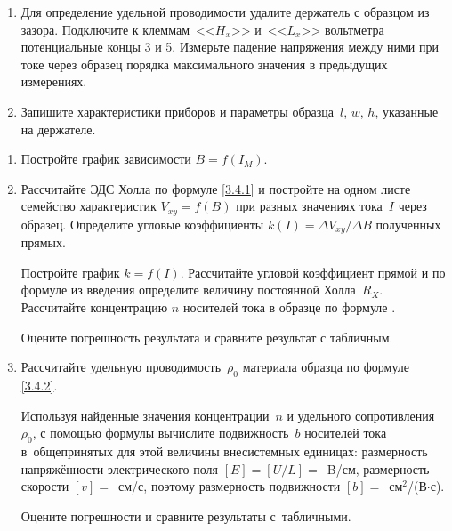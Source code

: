 \begin{lab:task}
\begin{enumerate}
{Направление тока в образце показано знаками~<<$+$>> и~<<$-$>> на
рис.~. Направление тока в обмотках электромагнита при установке
разъёма $K_1$ в положение I показано стрелкой на торце магнита.

Зарисуйте в тетради образец. Укажите на рисунке направления тока, магнитного
поля и отклонение носителей. По знаку ($\pm$) на клеммах цифрового вольтметра
определите характер проводимости.}

\item{Для определение удельной проводимости удалите держатель с образцом из
зазора. Подключите к клеммам~<<$H_{x}$>> и~<<$L_{x}$>> вольтметра потенциальные
концы 3 и 5. Измерьте падение напряжения между ними при токе через образец
порядка максимального значения в предыдущих измерениях.}

\item{ Запишите характеристики приборов и параметры образца~$l$, $w$, $h$,
указанные на держателе.}
\end{enumerate}

\begin{enumerate}

\item {Постройте график зависимости $B=f(I_{M})$.}

\item{ Рассчитайте ЭДС Холла по формуле \eqref{3.4.1} и постройте на одном листе
семейство характеристик $V_{xy}=f(B)$ при разных значениях тока~$I$ через
образец. Определите угловые коэффициенты $k(I)=\Delta{V_{xy}}/\Delta B$
полученных прямых.

Постройте график $k=f(I)$. Рассчитайте угловой коэффициент прямой и по формуле
 из введения определите величину постоянной Холла~$R_{X}$.
Рассчитайте концентрацию $n$ носителей тока в образце по формуле
.

Оцените погрешность результата и сравните результат с табличным.}


\item{ Рассчитайте удельную проводимость~$\rho_0$ материала образца по формуле
\eqref{3.4.2}.

Используя найденные значения концентрации~$n$ и удельного сопротивления
$\rho_0$, с помощью формулы  вычислите подвижность~$b$
носителей тока в~общепринятых для этой величины внесистемных единицах:
размерность напряжённости электрического поля $[E]=[U/L]=$~B/см, размерность
скорости $[v]=$~см/с, поэтому размерность
подвижности $[b]=$~см$^2$/(В$\cdot$с).

Оцените погрешности и сравните результаты с~табличными.}
\end{enumerate}
\end{lab:task}

